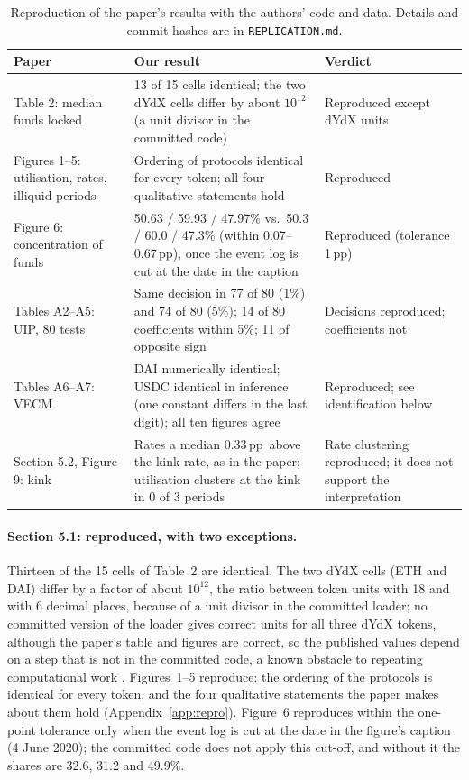 \documentclass[11pt]{article}
\newcommand{\pp}{\,pp}
\begin{document}
\begin{table}[t]
\centering\small
\begin{tabularx}{\textwidth}{@{}p{3.3cm}Xp{4.6cm}@{}}
\toprule
Paper & Our result & Verdict \\
\midrule
Table 2: median funds locked & 13 of 15 cells identical; the two dYdX cells differ by about $10^{12}$ (a unit divisor in the committed code) & Reproduced except dYdX units \\
Figures 1--5: utilisation, rates, illiquid periods & Ordering of protocols identical for every token; all four qualitative statements hold & Reproduced \\
Figure 6: concentration of funds & 50.63 / 59.93 / 47.97\% vs.\ 50.3 / 60.0 / 47.3\% (within 0.07--0.67\pp), once the event log is cut at the date in the caption & Reproduced (tolerance 1\pp) \\
Tables A2--A5: UIP, 80 tests & Same decision in 77 of 80 (1\%) and 74 of 80 (5\%); 14 of 80 coefficients within 5\%; 11 of opposite sign & Decisions reproduced; coefficients not \\
Tables A6--A7: VECM & DAI numerically identical; USDC identical in inference (one constant differs in the last digit); all ten figures agree & Reproduced; see identification below \\
Section 5.2, Figure 9: kink & Rates a median 0.33\pp\ above the kink rate, as in the paper; utilisation clusters at the kink in 0 of 3 periods & Rate clustering reproduced; it does not support the interpretation \\
\bottomrule
\end{tabularx}
\caption{Reproduction of the paper's results with the authors' code and data. Details and commit hashes are in \texttt{REPLICATION.md}.}
\label{tab:repro}
\end{table}

\paragraph{Section 5.1: reproduced, with two exceptions.} Thirteen of the 15 cells of Table~2 are identical. The two dYdX cells (ETH and DAI) differ by a factor of about $10^{12}$, the ratio between token units with 18 and with 6 decimal places, because of a unit divisor in the committed loader; no committed version of the loader gives correct units for all three dYdX tokens, although the paper's table and figures are correct, so the published values depend on a step that is not in the committed code, a known obstacle to repeating computational work \citep{collberg2016repeatability}. Figures~1--5 reproduce: the ordering of the protocols is identical for every token, and the four qualitative statements the paper makes about them hold (Appendix~\ref{app:repro}). Figure~6 reproduces within the one-point tolerance only when the event log is cut at the date in the figure's caption (4 June 2020); the committed code does not apply this cut-off, and without it the shares are 32.6, 31.2 and 49.9\%.
\end{document}
